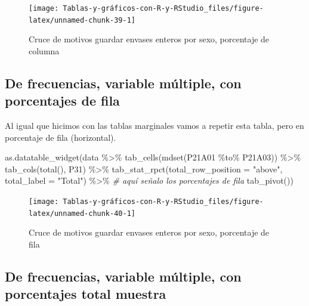 \documentclass[
]{book}
\newenvironment{Shaded}{\begin{snugshade}}{\end{snugshade}}
\newcommand{\AttributeTok}[1]{\textcolor[rgb]{0.77,0.63,0.00}{#1}}
\newcommand{\CommentTok}[1]{\textcolor[rgb]{0.56,0.35,0.01}{\textit{#1}}}
\newcommand{\FunctionTok}[1]{\textcolor[rgb]{0.00,0.00,0.00}{#1}}
\newcommand{\NormalTok}[1]{#1}
\newcommand{\SpecialCharTok}[1]{\textcolor[rgb]{0.00,0.00,0.00}{#1}}
\newcommand{\StringTok}[1]{\textcolor[rgb]{0.31,0.60,0.02}{#1}}
\begin{document}
\begin{figure}[H]

{\centering \texttt{[image: Tablas-y-gráficos-con-R-y-RStudio\_files/figure-latex/unnamed-chunk-39-1]} 

}

\caption{Cruce de motivos guardar envases enteros por sexo, porcentaje de columna}\label{fig:unnamed-chunk-39}
\end{figure}

\hypertarget{de-frecuencias-variable-muxfaltiple-con-porcentajes-de-fila}{%
\subsection{De frecuencias, variable múltiple, con porcentajes de fila}\label{de-frecuencias-variable-muxfaltiple-con-porcentajes-de-fila}}

Al igual que hicimos con las tablas marginales vamos a repetir esta tabla, pero en porcentaje de fila (horizontal).

\begin{Shaded}
\begin{Highlighting}[]
\FunctionTok{as.datatable\_widget}\NormalTok{(data }\SpecialCharTok{\%\textgreater{}\%}
    \FunctionTok{tab\_cells}\NormalTok{(}\FunctionTok{mdset}\NormalTok{(P21A01 }\SpecialCharTok{\%to\%}\NormalTok{ P21A03)) }\SpecialCharTok{\%\textgreater{}\%}
    \FunctionTok{tab\_cols}\NormalTok{(}\FunctionTok{total}\NormalTok{(), P31) }\SpecialCharTok{\%\textgreater{}\%}
    \FunctionTok{tab\_stat\_rpct}\NormalTok{(}\AttributeTok{total\_row\_position =} \StringTok{"above"}\NormalTok{, }\AttributeTok{total\_label =} \StringTok{"Total"}\NormalTok{) }\SpecialCharTok{\%\textgreater{}\%} \CommentTok{\# aquí señalo los porcentajes de fila}
    \FunctionTok{tab\_pivot}\NormalTok{())}
\end{Highlighting}
\end{Shaded}

\begin{figure}[H]

{\centering \texttt{[image: Tablas-y-gráficos-con-R-y-RStudio\_files/figure-latex/unnamed-chunk-40-1]} 

}

\caption{Cruce de motivos guardar envases enteros por sexo, porcentaje de fila}\label{fig:unnamed-chunk-40}
\end{figure}

\hypertarget{de-frecuencias-variable-muxfaltiple-con-porcentajes-total-muestra}{%
\subsection{De frecuencias, variable múltiple, con porcentajes total muestra}\label{de-frecuencias-variable-muxfaltiple-con-porcentajes-total-muestra}}
\end{document}
